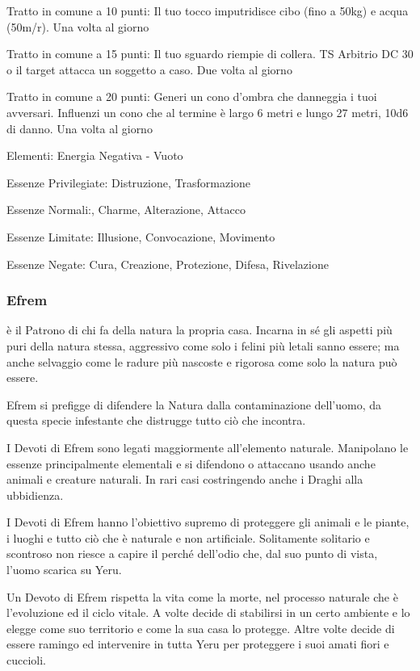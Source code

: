 \documentclass[a4paper,11pt,twoside,openany]{book}
\begin{document}
Tratto in comune a 10 punti: Il tuo tocco imputridisce cibo (fino a 50kg) e acqua (50m/r). Una volta al giorno

Tratto in comune a 15 punti: Il tuo sguardo riempie di collera. TS Arbitrio DC 30 o il target attacca un soggetto a caso. Due volta al giorno

Tratto in comune a 20 punti: Generi un cono d'ombra che danneggia i tuoi avversari. Influenzi un cono che al termine è largo 6 metri e lungo 27 metri, 10d6 di danno. Una volta al giorno

\bigskip

Elementi: Energia Negativa - Vuoto

\bigskip

Essenze Privilegiate: Distruzione, Trasformazione

Essenze Normali:, Charme, Alterazione, Attacco

Essenze Limitate: Illusione, Convocazione, Movimento

Essenze Negate: Cura, Creazione, Protezione, Difesa, Rivelazione

\subsubsection{Efrem}

\label{efrem}

è il Patrono di chi fa della natura la propria casa. Incarna in sé gli aspetti più puri della natura stessa, aggressivo come solo i felini più letali sanno essere; ma anche selvaggio come le radure più nascoste e rigorosa come solo la natura può essere.

Efrem si prefigge di difendere la Natura dalla contaminazione dell'uomo, da questa specie infestante che distrugge tutto ciò che incontra.

I Devoti di Efrem sono legati maggiormente all'elemento naturale. Manipolano le essenze principalmente elementali e si difendono o attaccano usando anche animali e creature naturali. In rari casi costringendo anche i Draghi alla ubbidienza.

I Devoti di Efrem hanno l'obiettivo supremo di proteggere gli animali e le piante, i luoghi e tutto ciò che è naturale e non artificiale. Solitamente solitario e scontroso non riesce a capire il perché dell'odio che, dal suo punto di vista, l'uomo scarica su Yeru.

Un Devoto di Efrem rispetta la vita come la morte, nel processo naturale che è l'evoluzione ed il ciclo vitale. A volte decide di stabilirsi in un certo ambiente e lo elegge come suo territorio e come la sua casa lo protegge. Altre volte decide di essere ramingo ed intervenire in tutta Yeru per proteggere i suoi amati fiori e cuccioli.
\end{document}
